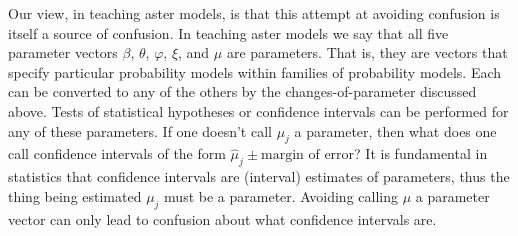\documentclass[11pt]{article}
\begin{document}
Our view, in teaching aster models, is that this attempt at avoiding confusion
is itself a source of confusion.  In teaching aster models we say that all
five parameter vectors $\beta$, $\theta$, $\varphi$, $\xi$, and $\mu$ are
parameters.  That is, they are vectors that specify particular probability
models within
families of probability models.  Each can be converted to any of the others
by the changes-of-parameter discussed above.
Tests of statistical hypotheses or confidence intervals can be performed
for any of these parameters.
If one doesn't call $\mu_j$ a parameter, then what does one call confidence
intervals of the form $\hat{\mu}_j \pm \text{margin of error}$?
It is fundamental in statistics that confidence intervals are (interval)
estimates of parameters, thus the thing being estimated $\mu_j$ must be
a parameter.  Avoiding calling $\mu$ a parameter vector can only lead
to confusion about what confidence intervals are.
\end{document}
